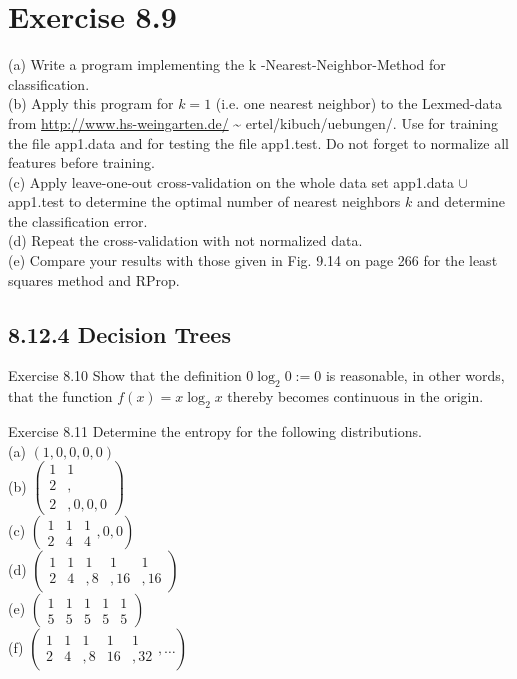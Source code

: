 \documentclass[10pt]{article}
\begin{document}
\section*{Exercise 8.9}
(a) Write a program implementing the k -Nearest-Neighbor-Method for classification.\\
(b) Apply this program for $k=1$ (i.e. one nearest neighbor) to the Lexmed-data from \href{http://www.hs-weingarten.de/}{http://www.hs-weingarten.de/} \~{} ertel/kibuch/uebungen/. Use for training the file app1.data and for testing the file app1.test. Do not forget to normalize all features before training.\\
(c) Apply leave-one-out cross-validation on the whole data set app1.data $\cup$ app1.test to determine the optimal number of nearest neighbors $k$ and determine the classification error.\\
(d) Repeat the cross-validation with not normalized data.\\
(e) Compare your results with those given in Fig. 9.14 on page 266 for the least squares method and RProp.

\subsection*{8.12.4 Decision Trees}
Exercise 8.10 Show that the definition $0 \log _{2} 0:=0$ is reasonable, in other words, that the function $f(x)=x \log _{2} x$ thereby becomes continuous in the origin.

Exercise 8.11 Determine the entropy for the following distributions.\\
(a) $(1,0,0,0,0)$\\
(b) $\left(\begin{array}{ll}1 & 1 \\ 2 & , \\ 2 & , 0,0,0\end{array}\right)$\\
(c) $\left(\begin{array}{ccc}1 & 1 & 1 \\ 2 & 4 & 4\end{array}, 0,0\right)$\\
(d) $\left(\begin{array}{ccccc}1 & 1 & 1 & 1 & 1 \\ 2 & 4 & , 8 & , 16 & , 16\end{array}\right)$\\
(e) $\left(\begin{array}{ccccc}1 & 1 & 1 & 1 & 1 \\ 5 & 5 & 5 & 5 & 5\end{array}\right)$\\
(f) $\left(\begin{array}{ccccc}1 & 1 & 1 & 1 & 1 \\ 2 & 4 & , 8 & 16 & , 32\end{array}, \ldots\right)$
\end{document}

